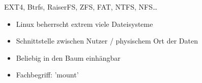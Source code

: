 \begin{frame}{EXT4, Btrfs, RaiserFS, ZFS, FAT, NTFS, NFS…}
\begin{itemize}
\item Linux beherrscht extrem viele Dateisysteme
\item Schnittstelle zwischen Nutzer / physischem Ort der Daten
\item Beliebig in den Baum einhängbar
\item Fachbegriff: 'mount'
\end{itemize}
\end{frame}